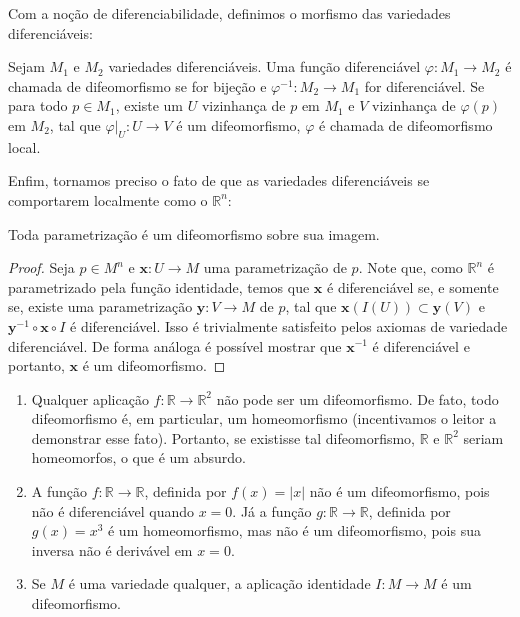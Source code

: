 Com a noção de diferenciabilidade, definimos o morfismo das variedades diferenciáveis:
\begin{definition}
    \label{loc:2.9_:_def_4_:_difeomorfismo.definição}
    Sejam $M_{1}$ e $M_{2}$ variedades diferenciáveis. Uma função diferenciável $\varphi:M_{1} \to M_{2}$ é chamada de difeomorfismo se for bijeção e $\varphi ^{-1}:M_{2}\to M_{1}$ for diferenciável.
    Se para todo $p \in M_{1}$, existe um $U$ vizinhança de $p$ em $M_{1}$ e $V$ vizinhança de $\varphi(p)$ em $M_{2}$, tal que $\varphi|_{U}:U\to V$ é um difeomorfismo, $\varphi$ é chamada de difeomorfismo local.
\end{definition}
Enfim, tornamos preciso o fato de que as variedades diferenciáveis se comportarem localmente como o $\mathbb{R}^{n}$:
\begin{proposition}
    \label{loc:2.9_:_def_4_:_difeomorfismo.resultados_acerca_difeomorfismos..proposição_3}
    Toda parametrização é um difeomorfismo sobre sua imagem.
    \begin{proof}

        Seja $p \in M^{n}$ e $\mathbf{x}:U\to M$ uma parametrização de $p$. Note que, como $\mathbb{R}^{n}$ é parametrizado pela função identidade, temos que $\mathbf{x}$ é diferenciável se, e somente se, existe uma parametrização $\mathbf{y}:V\to M$ de $p$, tal que $\mathbf{x}(I(U)) \subset \mathbf{y}(V)$ e $\mathbf{y}^{-1} \circ \mathbf{x} \circ I$ é diferenciável. Isso é trivialmente satisfeito pelos axiomas de variedade diferenciável.
        De forma análoga é possível mostrar que $\mathbf{x}^{-1}$ é diferenciável e portanto, $\mathbf{x}$ é um difeomorfismo.
    \end{proof}
\end{proposition}
\begin{examples}
    \label{loc:exemplos_de_difeomorfismos}
    \begin{enumerate}
        \item Qualquer aplicação $f:\mathbb{R} \to \mathbb{R}^{2}$ não pode ser um difeomorfismo. De fato, todo difeomorfismo é, em particular, um homeomorfismo (incentivamos o leitor a demonstrar esse fato). Portanto, se existisse tal difeomorfismo, $\mathbb{R}$ e $\mathbb{R}^{2}$ seriam homeomorfos, o que é um absurdo.
        \item A função $f:\mathbb{R}\to \mathbb{R}$, definida por $f(x)=|x|$ não é um difeomorfismo, pois não é diferenciável quando $x=0$. Já a função $g:\mathbb{R}\to \mathbb{R}$, definida por $g(x)=x^{3}$ é um homeomorfismo, mas não é um difeomorfismo, pois sua inversa não é derivável em $x=0.$
        \item Se $M$ é uma variedade qualquer, a aplicação identidade $I:M\to M$ é um difeomorfismo.
    \end{enumerate}
\end{examples}
